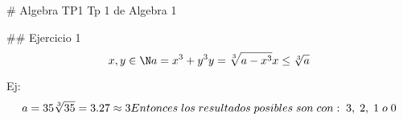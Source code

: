 # Algebra TP1
Tp 1 de Algebra 1

## Ejercicio 1
$$
x, y \in \N \\

a = x^{3} + y^{3} \\
y = \sqrt[3]{a-x^{3}} \\
x \leq \sqrt[3]{a}
$$

Ej:
$$
a = 35 \\
\sqrt[3]{35} = 3.27 \approx 3\\
Entonces\;los\;resultados\;posibles\;son\;con:\;3,\;2,\;1\;o\;0
$$

